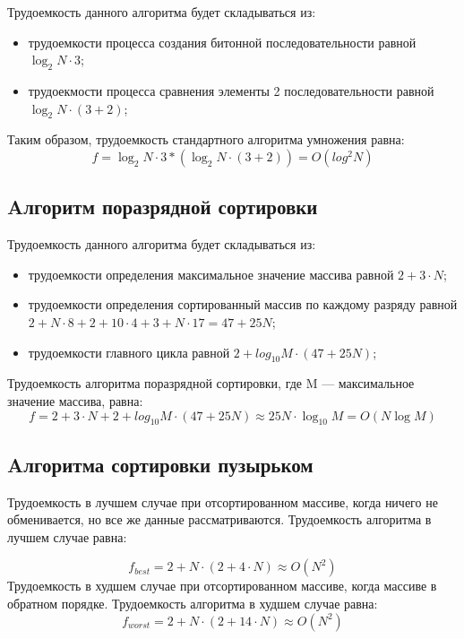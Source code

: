 Трудоемкость данного алгоритма будет складываться из:

\begin{itemize}
	\item трудоемкости процесса создания битонной последовательности равной $\log_{2}N \cdot 3$;
	\item трудоекмости процесса сравнения элементы 2 последовательности равной $\log_{2}N \cdot (3 + 2)$;
\end{itemize}

Таким образом, трудоемкость стандартного алгоритма умножения равна:
\begin{equation}
	\label{for:radix}
	f = \log_{2}N \cdot 3 * (\log_{2}N \cdot (3 + 2)) = O(log^2 N)
\end{equation}
\subsection{Aлгоритм поразрядной сортировки}

Трудоемкость данного алгоритма будет складываться из:

\begin{itemize}
	\item трудоемкости определения максимальное значение массива равной $2 + 3 \cdot N$;
	\item трудоемкости определения сортированный массив по каждому разряду равной
	 $2 + N\cdot 8 + 2 + 10 \cdot 4 + 3 + N \cdot 17 = 47 + 25N$;
	\item трудоемкости главного цикла равной $2 + log_{10} M \cdot (47 + 25N)$;
\end{itemize}

Трудоемкость алгоритма поразрядной сортировки, где M --- максимальное значение массива, равна:
\begin{equation}
	\label{for:radix}
	f = 2 + 3 \cdot N + 2 + log_{10}M\cdot(47 + 25N) \approx 25N\cdot\log_{10}M = O(N\log{M})
\end{equation}

\subsection{Aлгоритма сортировки пузырьком}

Трудоемкость в лучшем случае при отсортированном массиве, когда ничего не обменивается, но все же данные рассматриваются. 
Трудоемкость алгоритма в лучшем случае равна:

\begin{equation}
	\label{for:bubble1}
	f_{best} =  2 + N \cdot(2 + 4 \cdot N) \approx O(N ^ 2)
\end{equation}
Трудоемкость в худшем случае при отсортированном массиве, когда массиве в обратном порядке. Трудоемкость алгоритма в худшем случае равна:
\begin{equation}
	\label{for:bubble2}
	f_{worst} =  2 + N \cdot(2 + 14 \cdot N) \approx O(N ^ 2)
\end{equation}

